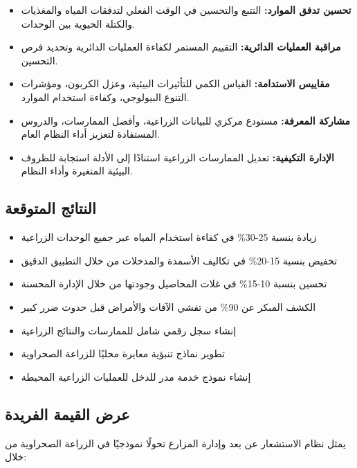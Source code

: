 \begin{itemize}
    \item \textbf{تحسين تدفق الموارد:} التتبع والتحسين في الوقت الفعلي لتدفقات المياه والمغذيات والكتلة الحيوية بين الوحدات.
    
    \item \textbf{مراقبة العمليات الدائرية:} التقييم المستمر لكفاءة العمليات الدائرية وتحديد فرص التحسين.
    
    \item \textbf{مقاييس الاستدامة:} القياس الكمي للتأثيرات البيئية، وعزل الكربون، ومؤشرات التنوع البيولوجي، وكفاءة استخدام الموارد.
    
    \item \textbf{مشاركة المعرفة:} مستودع مركزي للبيانات الزراعية، وأفضل الممارسات، والدروس المستفادة لتعزيز أداء النظام العام.
    
    \item \textbf{الإدارة التكيفية:} تعديل الممارسات الزراعية استنادًا إلى الأدلة استجابة للظروف البيئية المتغيرة وأداء النظام.
\end{itemize}

\subsection{النتائج المتوقعة}
\begin{itemize}
    \item زيادة بنسبة 25-30\% في كفاءة استخدام المياه عبر جميع الوحدات الزراعية
    \item تخفيض بنسبة 15-20\% في تكاليف الأسمدة والمدخلات من خلال التطبيق الدقيق
    \item تحسين بنسبة 10-15\% في غلات المحاصيل وجودتها من خلال الإدارة المحسنة
    \item الكشف المبكر عن 90\% من تفشي الآفات والأمراض قبل حدوث ضرر كبير
    \item إنشاء سجل رقمي شامل للممارسات والنتائج الزراعية
    \item تطوير نماذج تنبؤية معايرة محليًا للزراعة الصحراوية
    \item إنشاء نموذج خدمة مدر للدخل للعمليات الزراعية المحيطة
\end{itemize}

\subsection{عرض القيمة الفريدة}
يمثل نظام الاستشعار عن بعد وإدارة المزارع تحولًا نموذجيًا في الزراعة الصحراوية من خلال:

